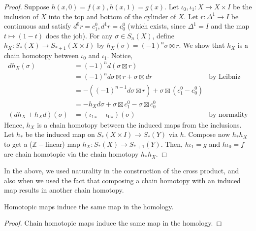 \documentclass[12pt,reqno]{amsart}
\numberwithin{theorem}{section}
\theoremstyle{definition}
\theoremstyle{remark}
\numberwithin{equation}{section}
\newcommand{\Z}{\mathbb Z}
\theoremstyle{definition}
\begin{document}
\begin{proof}
    Suppose $h(x,0) = f(x), h(x,1)=g(x)$. Let $\iota_0,\iota_1:X\rightarrow X\times I$ be the inclusion of $X$ into the top and bottom of the cylinder of $X$. Let $r:\Delta^1\rightarrow I$ be continuous and satisfy $d^0r = c_1^0,d^1r = c_0^0$ (which exists, since $\Delta^1 = I$ and the map $t \mapsto (1-t)$ does the job). For any $\sigma \in S_n(X)$, define $h_X: S_*(X) \rightarrow S_{*+1}(X\times I)$ by $h_X(\sigma) = (-1)^n\sigma \boxtimes r$. We show that $h_X$ is a chain homotopy between $\iota_0$ and $\iota_1$. Notice,
    \begin{align*}
        dh_X(\sigma) &= (-1)^nd(\sigma \boxtimes r) \\
                    &= (-1)^nd\sigma \boxtimes r + \sigma \boxtimes dr & \text{by Leibniz}\\
                    &= -((-1)^{n-1}d\sigma \boxtimes r) + \sigma \boxtimes(c_1^0 -c_0^0) \\
                    &= -h_Xd\sigma + \sigma \boxtimes c_1^0-\sigma \boxtimes c_0^0 \\
         (dh_X+h_Xd) (\sigma)          &= ({\iota_1}_*-{\iota_0}_*)(\sigma) & \text{by normality}
    \end{align*}
    Hence, $h_X$ is a chain homotopy between the induced maps from the inclusions. Let $h_*$ be the induced map on $S_*(X\times I)\rightarrow S_*(Y)$ via $h$. Compose now $h_* h_X$ to get a ($\Z-$linear) map $h_X: S_*(X) \rightarrow S_{*+1}(Y)$. Then, $h\iota_1=g$ and $h\iota_0=f$ are chain homotopic via the chain homotopy $h_* h_X$.
\end{proof}
In the above, we used naturality in the construction of the cross product, and also when we used the fact that composing a chain homotopy with an induced map results in another chain homotopy.
\begin{corollary}
    Homotopic maps induce the same map in the homology.
\end{corollary}
\begin{proof}
    Chain homotopic maps induce the same map in the homology.
\end{proof}
\end{document}
